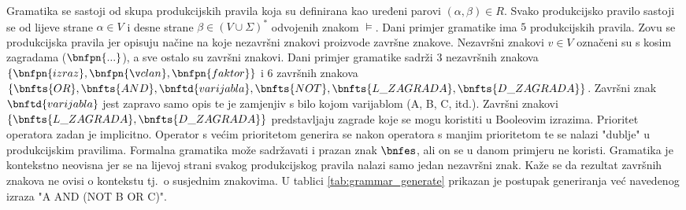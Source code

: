 \documentclass[times, utf8, diplomski]{fer}
\begin{document}
Gramatika se sastoji od skupa produkcijskih pravila koja su definirana kao uređeni parovi $(\alpha, \beta) \in R$. Svako produkcijsko pravilo sastoji se od lijeve strane $\alpha \in V$ i desne strane $\beta \in (V \cup \Sigma)^{*}$ odvojenih znakom $\models$. Dani primjer gramatike ima $5$ produkcijskih pravila. Zovu se produkcijska pravila jer opisuju načine na koje nezavršni znakovi proizvode završne znakove. Nezavršni znakovi $v \in V$ označeni su s kosim zagradama ($\bnfpn{...}$), a sve ostalo su završni znakovi. Dani primjer gramatike sadrži $3$ nezavršnih znakova $\{ \bnfpn{izraz}, \bnfpn{član}, \bnfpn{faktor} \}$ i $6$ završnih znakova $\{ \bnfts{OR}, \bnfts{AND}, \bnftd{varijabla}, \bnfts{NOT}, \bnfts{L\_ZAGRADA}, \bnfts{D\_ZAGRADA} \}$. Završni znak $\bnftd{varijabla}$ jest zapravo samo opis te je zamjenjiv s bilo kojom varijablom (A, B, C, itd.). Završni znakovi $\{\bnfts{L\_ZAGRADA}, \bnfts{D\_ZAGRADA}\}$ predstavljaju zagrade koje se mogu koristiti u Booleovim izrazima. Prioritet operatora zadan je implicitno. Operator s većim prioritetom generira se nakon operatora s manjim prioritetom te se nalazi "dublje" u produkcijskim pravilima. Formalna gramatika može sadržavati i prazan znak $\bnfes$, ali on se u danom primjeru ne koristi. Gramatika je kontekstno neovisna jer se na lijevoj strani svakog produkcijskog pravila nalazi samo jedan nezavršni znak. Kaže se da rezultat završnih znakova ne ovisi o kontekstu tj.~o susjednim znakovima. U tablici \ref{tab:grammar_generate} prikazan je postupak generiranja već navedenog izraza "A AND (NOT B OR C)".
\end{document}
